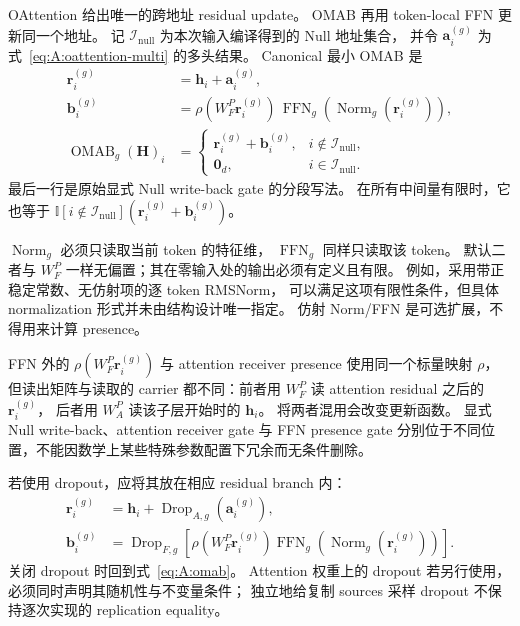 \documentclass[11pt,UTF8,fontset=fandol]{ctexart}
\numberwithin{equation}{section}
\theoremstyle{definition}
\newcommand{\Iset}{\mathcal I}
\newcommand{\ind}{\mathbb I}
\newcommand{\OMAB}{\operatorname{OMAB}}
\begin{document}
OAttention 给出唯一的跨地址 residual update。
OMAB 再用 token-local FFN 更新同一个地址。
记 $\Iset_{\mathrm{null}}$ 为本次输入编译得到的 Null 地址集合，
并令 $\bm a_i^{(g)}$ 为式~\eqref{eq:A:oattention-multi} 的多头结果。
Canonical 最小 OMAB 是
\begin{equation}
 \begin{aligned}
  \bm r_i^{(g)}
    &=\bm h_i+\bm a_i^{(g)},\\
  \bm b_i^{(g)}
    &=\rho(W_F^{P}\bm r_i^{(g)})\,
      \operatorname{FFN}_g\!\left(
        \operatorname{Norm}_g(\bm r_i^{(g)})\right),\\
  \OMAB_g(\bm H)_i
    &=\begin{cases}
       \bm r_i^{(g)}+\bm b_i^{(g)},&i\notin\Iset_{\mathrm{null}},\\
       \bm0_d,&i\in\Iset_{\mathrm{null}}.
      \end{cases}
 \end{aligned}
 \label{eq:A:omab}
\end{equation}
最后一行是原始显式 Null write-back gate 的分段写法。
在所有中间量有限时，它也等于
$\ind[i\notin\Iset_{\mathrm{null}}](\bm r_i^{(g)}+\bm b_i^{(g)})$。

$\operatorname{Norm}_g$ 必须只读取当前 token 的特征维，
$\operatorname{FFN}_g$ 同样只读取该 token。
默认二者与 $W_F^{P}$ 一样无偏置；其在零输入处的输出必须有定义且有限。
例如，采用带正稳定常数、无仿射项的逐 token RMSNorm，
可以满足这项有限性条件，但具体 normalization 形式并未由结构设计唯一指定。
仿射 Norm/FFN 是可选扩展，不得用来计算 presence。

FFN 外的 $\rho(W_F^{P}\bm r_i^{(g)})$ 与 attention receiver presence 使用同一个标量映射 $\rho$，
但读出矩阵与读取的 carrier 都不同：前者用 $W_F^{P}$ 读 attention residual 之后的 $\bm r_i^{(g)}$，
后者用 $W_A^{P}$ 读该子层开始时的 $\bm h_i$。
将两者混用会改变更新函数。
显式 Null write-back、attention receiver gate 与 FFN presence gate
分别位于不同位置，不能因数学上某些特殊参数配置下冗余而无条件删除。

若使用 dropout，应将其放在相应 residual branch 内：
\begin{equation}
 \begin{aligned}
  \bm r_i^{(g)}
   &=\bm h_i+\operatorname{Drop}_{A,g}(\bm a_i^{(g)}),\\
  \bm b_i^{(g)}
   &=\operatorname{Drop}_{F,g}\!\left[
        \rho(W_F^{P}\bm r_i^{(g)})
        \operatorname{FFN}_g(\operatorname{Norm}_g(\bm r_i^{(g)}))
      \right].
 \end{aligned}
 \label{eq:A:dropout-branches}
\end{equation}
关闭 dropout 时回到式~\eqref{eq:A:omab}。
Attention 权重上的 dropout 若另行使用，必须同时声明其随机性与不变量条件；
独立地给复制 sources 采样 dropout 不保持逐次实现的 replication equality。
\end{document}
